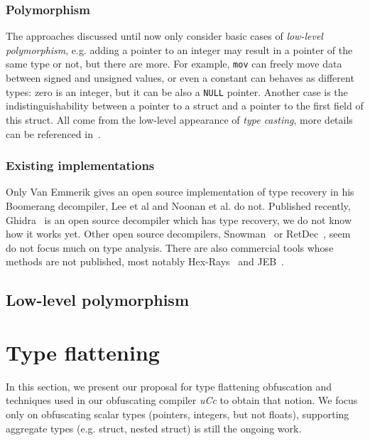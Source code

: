 \documentclass[compsoc,conference,a4paper,10pt,times]{IEEEtran}
\begin{document}
\subsubsection*{Polymorphism}
The approaches discussed until now only consider basic cases of \emph{low-level polymorphism}, e.g.
adding a pointer to an integer may result in a pointer of the same type or not, but there are more.
For example, \texttt{mov} can freely move data between signed and unsigned values, or even a constant
can behaves as different types: zero is an integer, but it can be also a
\texttt{NULL} pointer. Another case is the indistinguishability between a pointer to a struct and
a pointer to the first field of this struct. All come from the low-level appearance of
\emph{type casting}, more details can be referenced in~\cite{siff_coping_1999}.



\subsubsection*{Existing implementations}
Only Van Emmerik gives an open source implementation of type recovery in his Boomerang decompiler,
Lee et al and Noonan et al. do not. Published recently, Ghidra~\cite{noauthor_ghidra_nodate} is an
open source decompiler which has type recovery, we do not know how it works yet.
Other open source decompilers, Snowman~\cite{noauthor_snowman_nodate} or
RetDec~\cite{kroustek_retdec_2017}, seem do not focus much on type analysis.
There are also commercial tools whose methods are not published,
most notably Hex-Rays~\cite{noauthor_hex-rays_nodate} and JEB~\cite{noauthor_jeb_nodate}.

\subsection{Low-level polymorphism}

\section{Type flattening}
\noindent
In this section, we present our proposal for type flattening obfuscation and techniques used in
our obfuscating compiler \emph{uCc} to obtain that notion. We
focus only on obfuscating scalar types (pointers, integers, but not floats), supporting aggregate types
(e.g. struct, nested struct) is still the ongoing work.

\end{document}
